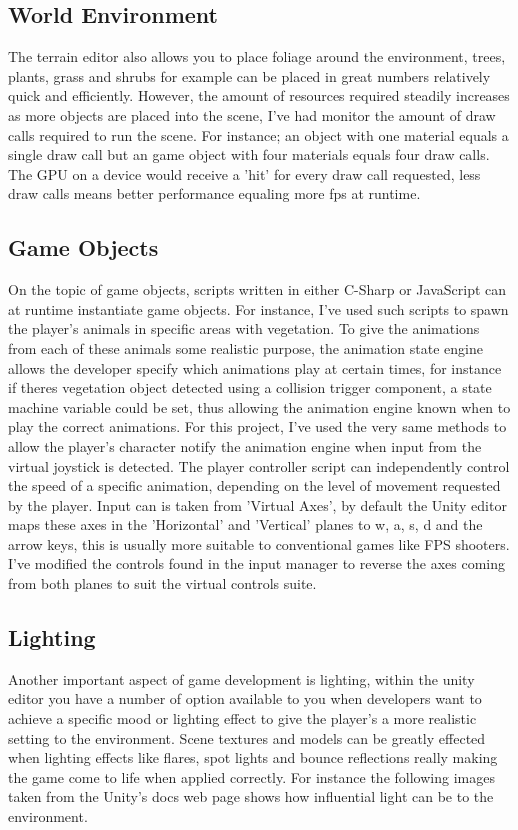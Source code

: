 \subsection{World Environment}
The terrain editor also allows you to place foliage around the environment, trees, plants, grass and shrubs for example can be placed in great numbers relatively quick and efficiently. However, the amount of resources required steadily increases as more objects are placed into the scene, I've had monitor the amount of draw calls required to run the scene. For instance; an object with one material equals a single draw call but an game object with four materials equals four draw calls. The GPU on a device would receive a 'hit' for every draw call requested, less draw calls means better performance equaling more fps at runtime.
\subsection{Game Objects}
On the topic of game objects, scripts written in either C-Sharp or JavaScript can at runtime instantiate game objects. For instance, I've used such scripts to spawn the player's animals in specific areas with vegetation. To give the animations from each of these animals some realistic purpose, the animation state engine allows the developer specify which animations play at certain times, for instance if theres vegetation object detected using a collision trigger component, a state machine variable could be set, thus allowing the animation engine known when to play the correct animations. For this project, I've used the very same methods to allow the player's character notify the animation engine when input from the virtual joystick is detected. The player controller script can independently control the speed of a specific animation, depending on the level of movement requested by the player. Input can is taken from 'Virtual Axes', by default the Unity editor maps these axes in the 'Horizontal' and 'Vertical' planes to w, a, s, d and the arrow keys, this is usually more suitable to conventional games like FPS shooters. I've modified the controls found in the input manager to reverse the axes coming from both planes to suit the virtual controls suite.
\subsection{Lighting}
Another important aspect of game development is lighting, within the unity editor you have a number of option available to you when developers want to achieve a specific mood or lighting effect to give the player's a more realistic setting to the environment. Scene textures and models can be greatly effected when lighting effects like flares, spot lights and bounce reflections really making the game come to life when applied correctly. For instance the following images taken from the Unity's docs web page shows how influential light can be to the environment.

